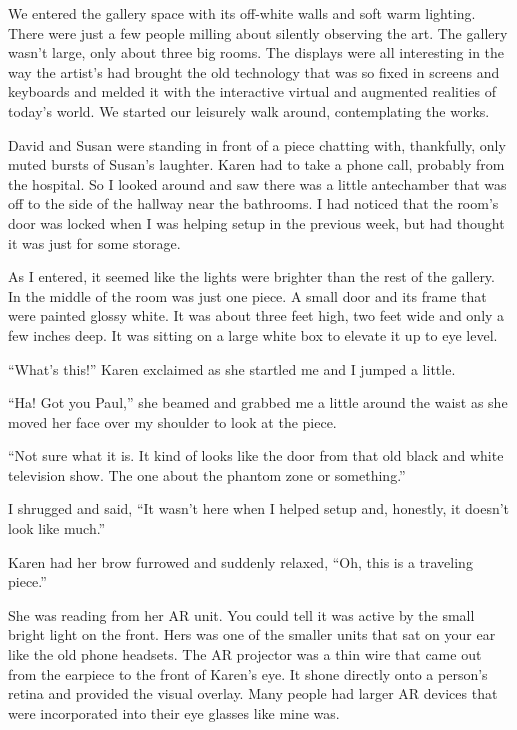 \subsectsep

We entered the gallery space with its off-white walls and soft
warm lighting. There were just a few people milling about
silently observing the art.  The gallery wasn't large, only
about three big rooms. The displays were all interesting in the
way the artist's had brought the old technology that was so
fixed in screens and keyboards and melded it with the
interactive virtual and augmented realities of today's world. We
started our leisurely walk around, contemplating the works.

David and Susan were standing in front of a piece chatting with,
thankfully, only muted bursts of Susan's laughter.  Karen had to
take a phone call, probably from the hospital. So I looked
around and saw there was a little antechamber that was off to
the side of the hallway near the bathrooms.  I had noticed that
the room's door was locked when I was helping setup in the
previous week, but had thought it was just for some storage.

As I entered, it seemed like the lights were brighter than the
rest of the gallery. In the middle of the room was just one
piece. A small door and its frame that were painted glossy
white. It was about three feet high, two feet wide and only a
few inches deep. It was sitting on a large white box to elevate
it up to eye level.


``What's this!'' Karen exclaimed as she startled me and I jumped a
little.

``Ha! Got you Paul,'' she beamed and grabbed me a little around the waist
as she moved her face over my shoulder to look at the piece.

``Not sure what it is. It kind of looks
like the door from that old black and white television show. The
one about the phantom zone or something.''

I shrugged and said, ``It wasn't here when I helped setup and,
honestly, it doesn't look like much.''

Karen had her brow furrowed and suddenly relaxed, ``Oh, this is
a traveling piece.''

She was reading from her AR unit. You could tell it was active
by the small bright light on the front. Hers was one of the
smaller units that sat on your ear like the old phone headsets.
The AR projector was a thin wire that came out from the earpiece
to the front of Karen's eye. It shone directly onto a person's
retina and provided the visual overlay. Many people had larger
AR devices that were incorporated into their eye glasses like
mine was.

